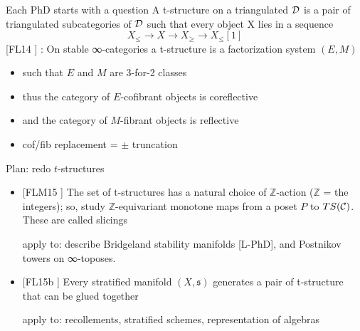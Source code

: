 \documentclass{beamer}
\def\lnk#1{\href{#1}{\faFilePdfO}}
\begin{document}
%
%
%
%
%
\begin{frame}{Each PhD starts with a question}
  A \alert{t-structure} on a triangulated $\cal D$ is a pair of triangulated subcategories of $\cal D$ such that every object X lies in a sequence
\[X_{\le} \to X \to X_\ge \to X_\le[1]\]
[\alert{FL14} \lnk{https://link.springer.com/article/10.1007/s10485-015-9393-z}] : On stable ∞-categories a t-structure is a factorization system $(E,M)$
\begin{itemize}
\item<+-> such that $E$ and $M$ are 3-for-2 classes
\item<+-> thus the category of $E$-cofibrant objects is coreflective
\item<+-> and the category of $M$-fibrant objects is reflective
\item<+-> cof/fib replacement = $\pm$ truncation
\end{itemize}
\end{frame}
%
%
%
\begin{frame}{Plan: redo $t$-structures}
  \begin{itemize}
\item<+-> {} [\alert{FLM15} \lnk{https://link.springer.com/article/10.1007/s40062-019-00237-0}] The set of t-structures has a natural choice of $\mathbb Z$-action ($\mathbb Z$ = the integers); so, study $\mathbb Z$-equivariant monotone maps from a poset $P$ to $TS(\cal C)$. These are called \alert{slicings}

{\footnotesize apply to: describe Bridgeland stability manifolds [\alert{L-PhD\lnk{http://tetrapharmakon.github.io/stuff/main.pdf}}], and Postnikov towers on ∞-toposes.}

\item<+-> {} [\alert{FL15b} \lnk{https://arxiv.org/abs/1507.03913}] Every stratified manifold $(X,\mathfrak s)$ generates a pair of t-structure that can be glued together

{\footnotesize apply to: recollements, stratified schemes, representation of algebras}

  \end{itemize}
\end{frame}
%
%
%
%
%
\end{document}
